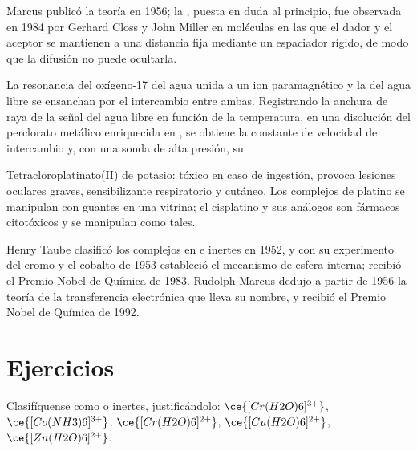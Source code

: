 Marcus publicó la teoría en 1956; la , puesta en duda al principio, fue
observada en 1984 por Gerhard Closs y John Miller en moléculas en las que el dador y el
aceptor se mantienen a una distancia fija mediante un espaciador rígido, de modo que la difusión
no puede ocultarla.

\begin{inthelab}
La resonancia del oxígeno-17 del agua unida a un ion paramagnético y la del agua
libre se ensanchan por el intercambio entre ambas. Registrando la anchura de raya de la
señal del agua libre en función de la temperatura, en una disolución del perclorato metálico
enriquecida en , se obtiene la constante de velocidad de intercambio y, con una sonda de alta presión,
su .
\end{inthelab}

\begin{safety}{}
Tetracloroplatinato(II) de potasio: tóxico en caso de ingestión, provoca lesiones oculares
graves, sensibilizante respiratorio y cutáneo. Los complejos de platino se manipulan con
guantes en una vitrina; el cisplatino y sus análogos son fármacos citotóxicos y se
manipulan como tales.
\end{safety}

\begin{history}
Henry Taube clasificó los complejos en  e inertes en 1952, y con su
experimento del cromo y el cobalto de 1953 estableció el mecanismo de esfera interna;
recibió el Premio Nobel de Química de 1983. Rudolph Marcus dedujo a partir de 1956 la
teoría de la transferencia electrónica que lleva su nombre, y recibió el Premio Nobel
de Química de 1992.
\end{history}

\section{Ejercicios}

\begin{exercise}[$\star$]\label{exo:b3:complex-mechanisms:1}
Clasifíquense como  o inertes, justificándolo: $\ce{[Cr(H2O)6]^{3+}}$, $\ce{[Co(NH3)6]^{3+}}$, $\ce{[Cr(H2O)6]^{2+}}$,
$\ce{[Cu(H2O)6]^{2+}}$, $\ce{[Zn(H2O)6]^{2+}}$.
\end{exercise}

